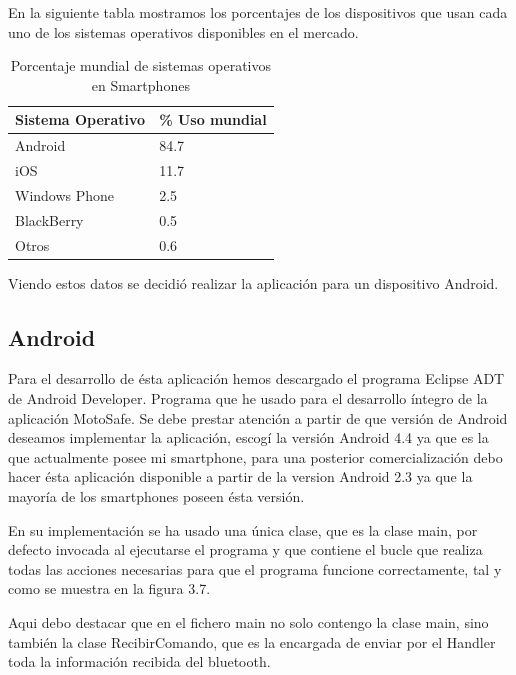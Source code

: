 			En la siguiente tabla mostramos los porcentajes de los dispositivos que usan cada uno de los sistemas operativos disponibles en el mercado.
			
			\begin{table}[H]
				\centering
				\begin{tabular}{p{4cm} p{4cm}}
					\hline
					Sistema Operativo & \% Uso mundial \\
					\hline \hline
					Android & 84.7 \\
					\hline
					iOS & 11.7 \\
					\hline
					Windows Phone & 2.5 \\
					\hline
					BlackBerry & 0.5 \\
					\hline
					Otros & 0.6 \\
					\hline
				\end{tabular}
				\caption{Porcentaje mundial de sistemas operativos en Smartphones}
				\label{tabla:AndroidVsiOS}
			\end{table}
			
			Viendo estos datos se decidió realizar la aplicación para un dispositivo Android.
		
		\subsection{Android}
		
			Para el desarrollo de ésta aplicación hemos descargado el programa Eclipse ADT de Android Developer. Programa que he usado para el desarrollo íntegro de la aplicación MotoSafe. Se debe prestar atención a partir de que versión de Android deseamos implementar la aplicación, escogí la versión Android 4.4 ya que es la que actualmente posee mi smartphone, para una posterior comercialización debo hacer ésta aplicación disponible a partir de la version Android 2.3 ya que la mayoría de los smartphones poseen ésta versión.
			
			En su implementación se ha usado una única clase, que es la clase main, por defecto invocada al ejecutarse el programa y que contiene el bucle que realiza todas las acciones necesarias para que el programa funcione correctamente,  tal y como se muestra en la figura 3.7. 
			
			Aqui debo destacar que en el fichero main no solo contengo la clase main, sino también la clase RecibirComando, que es la encargada de enviar por el Handler toda la información recibida del bluetooth.
		
